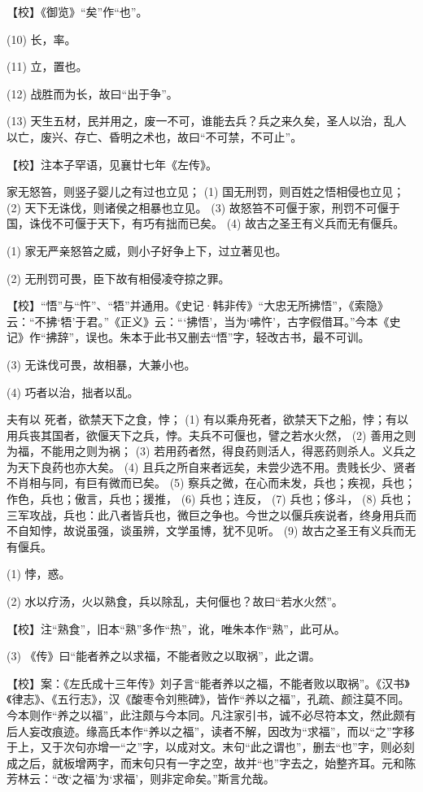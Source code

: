 \documentclass[12pt,UTF8]{ctexbook}
\begin{document}
【校】《御览》“矣”作“也”。

(10) 长，率。

(11) 立，置也。

(12) 战胜而为长，故曰“出于争”。

(13) 天生五材，民并用之，废一不可，谁能去兵？兵之来久矣，圣人以治，乱人以亡，废兴、存亡、昏明之术也，故曰“不可禁，不可止”。

【校】注本子罕语，见襄廿七年《左传》。

家无怒笞，则竖子婴儿之有过也立见； (1) 国无刑罚，则百姓之悟相侵也立见； (2) 天下无诛伐，则诸侯之相暴也立见。 (3) 故怒笞不可偃于家，刑罚不可偃于国，诛伐不可偃于天下，有巧有拙而已矣。 (4) 故古之圣王有义兵而无有偃兵。

(1) 家无严亲怒笞之威，则小子好争上下，过立著见也。

(2) 无刑罚可畏，臣下故有相侵凌夺掠之罪。

【校】“悟”与“忤”、“牾”并通用。《史记·韩非传》“大忠无所拂悟”，《索隐》云：“不拂‘牾’于君。”《正义》云：“‘拂悟’，当为‘咈忤’，古字假借耳。”今本《史记》作“拂辞”，误也。朱本于此书又删去“悟”字，轻改古书，最不可训。

(3) 无诛伐可畏，故相暴，大兼小也。

(4) 巧者以治，拙者以乱。

夫有以 死者，欲禁天下之食，悖； (1) 有以乘舟死者，欲禁天下之船，悖；有以用兵丧其国者，欲偃天下之兵，悖。夫兵不可偃也，譬之若水火然， (2) 善用之则为福，不能用之则为祸； (3) 若用药者然，得良药则活人，得恶药则杀人。义兵之为天下良药也亦大矣。 (4) 且兵之所自来者远矣，未尝少选不用。贵贱长少、贤者不肖相与同，有巨有微而已矣。 (5) 察兵之微，在心而未发，兵也；疾视，兵也；作色，兵也；傲言，兵也；援推， (6) 兵也；连反， (7) 兵也；侈斗， (8) 兵也；三军攻战，兵也：此八者皆兵也，微巨之争也。今世之以偃兵疾说者，终身用兵而不自知悖，故说虽强，谈虽辨，文学虽博，犹不见听。 (9) 故古之圣王有义兵而无有偃兵。

(1) 悖，惑。

(2) 水以疗汤，火以熟食，兵以除乱，夫何偃也？故曰“若水火然”。

【校】注“熟食”，旧本“熟”多作“热”，讹，唯朱本作“熟”，此可从。

(3) 《传》曰“能者养之以求福，不能者败之以取祸”，此之谓。

【校】案：《左氏成十三年传》刘子言“能者养以之福，不能者败以取祸”。《汉书》《律志》、《五行志》，汉《酸枣令刘熊碑》，皆作“养以之福”，孔疏、颜注莫不同。今本则作“养之以福”，此注颇与今本同。凡注家引书，诚不必尽符本文，然此颇有后人妄改痕迹。缘高氏本作“养以之福”，读者不解，因改为“求福”，而以“之”字移于上，又于次句亦增一“之”字，以成对文。末句“此之谓也”，删去“也”字，则必刻成之后，就板增两字，而末句只有一字之空，故并“也”字去之，始整齐耳。元和陈芳林云：“改‘之福’为‘求福’，则非定命矣。”斯言允哉。
\end{document}
